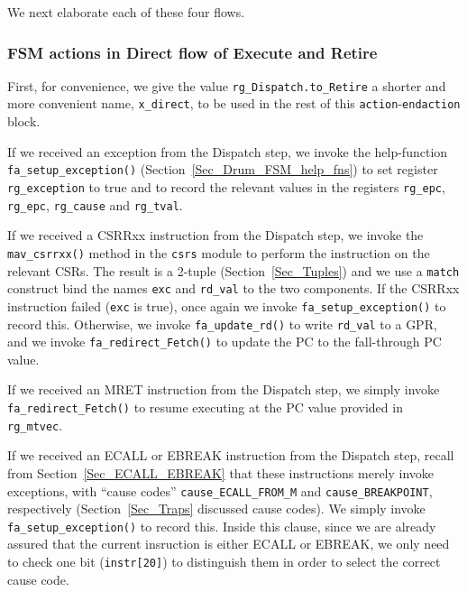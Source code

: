 We next elaborate each of these four flows.


\subsubsection{FSM actions in Direct flow of Execute and Retire}



First, for convenience, we give the value \verb|rg_Dispatch.to_Retire|
a shorter and more convenient name, \verb|x_direct|, to be used in the
rest of this \verb|action|-\verb|endaction| block.

If we received an exception from the Dispatch step, we invoke the
help-function \verb|fa_setup_exception()|
(Section~\ref{Sec_Drum_FSM_help_fns}) to set register
\verb|rg_exception| to true and to record the relevant values in the
registers \verb|rg_epc|, \verb|rg_epc|, \verb|rg_cause| and
\verb|rg_tval|.

If we received a CSRRxx instruction from the Dispatch step, we invoke
the \verb|mav_csrrxx()| method in the \verb|csrs| module to perform
the instruction on the relevant CSRs.  The result is a 2-tuple
(Section~\ref{Sec_Tuples}) and we use a \verb|match| construct bind
the names \verb|exc| and \verb|rd_val| to the two components.  If the
CSRRxx instruction failed (\verb|exc| is true), once again we invoke
\verb|fa_setup_exception()| to record this.  Otherwise, we invoke
\verb|fa_update_rd()| to write \verb|rd_val| to a GPR, and we invoke
\verb|fa_redirect_Fetch()| to update the PC to the fall-through PC
value.

If we received an MRET instruction from the Dispatch step, we simply
invoke \verb|fa_redirect_Fetch()| to resume executing at the PC value
provided in \verb|rg_mtvec|.

If we received an ECALL or EBREAK instruction from the Dispatch step,
recall from Section~\ref{Sec_ECALL_EBREAK} that these instructions
merely invoke exceptions, with ``cause codes''
\verb|cause_ECALL_FROM_M| and \verb|cause_BREAKPOINT|, respectively
(Section~\ref{Sec_Traps} discussed cause codes).  We simply invoke
\verb|fa_setup_exception()| to record this.  Inside this clause, since
we are already assured that the current insruction is either ECALL or
EBREAK, we only need to check one bit (\verb|instr[20]|) to
distinguish them in order to select the correct cause code.

